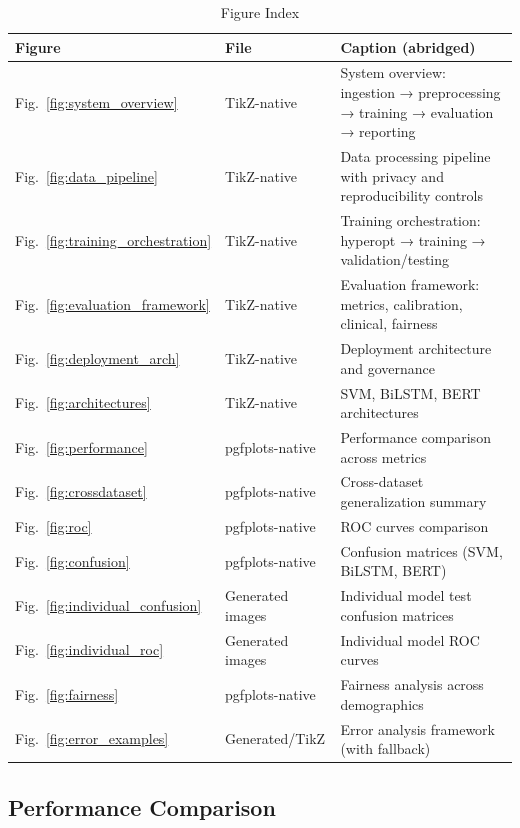 \documentclass[conference]{IEEEtran}
\begin{document}
\begin{table}[H]
\centering
\caption{Figure Index}
\label{tab:figure_index}
{\small
\setlength{\tabcolsep}{4pt}
\begin{tabular}{@{}ll>{\raggedright\arraybackslash}p{5.4cm}@{}}
\toprule
\textbf{Figure} & \textbf{File} & \textbf{Caption (abridged)} \\
\midrule
Fig.~\ref{fig:system_overview} & TikZ-native & System overview: ingestion → preprocessing → training → evaluation → reporting \\
Fig.~\ref{fig:data_pipeline} & TikZ-native & Data processing pipeline with privacy and reproducibility controls \\
Fig.~\ref{fig:training_orchestration} & TikZ-native & Training orchestration: hyperopt → training → validation/testing \\
Fig.~\ref{fig:evaluation_framework} & TikZ-native & Evaluation framework: metrics, calibration, clinical, fairness \\
Fig.~\ref{fig:deployment_arch} & TikZ-native & Deployment architecture and governance \\
Fig.~\ref{fig:architectures} & TikZ-native & SVM, BiLSTM, BERT architectures \\
Fig.~\ref{fig:performance} & pgfplots-native & Performance comparison across metrics \\
Fig.~\ref{fig:crossdataset} & pgfplots-native & Cross-dataset generalization summary \\
Fig.~\ref{fig:roc} & pgfplots-native & ROC curves comparison \\
Fig.~\ref{fig:confusion} & pgfplots-native & Confusion matrices (SVM, BiLSTM, BERT) \\
Fig.~\ref{fig:individual_confusion} & Generated images & Individual model test confusion matrices \\
Fig.~\ref{fig:individual_roc} & Generated images & Individual model ROC curves \\
Fig.~\ref{fig:fairness} & pgfplots-native & Fairness analysis across demographics \\
Fig.~\ref{fig:error_examples} & Generated/TikZ & Error analysis framework (with fallback) \\
\bottomrule
\end{tabular}
}
\end{table}

\subsection{Performance Comparison}
\end{document}
